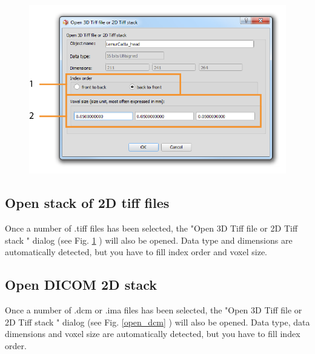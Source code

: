\begin{figure}
  \centering  
 \includegraphics[scale=1]{images/07/volume/open_tiff2.png}
\label{open_tiff}
\end{figure}


\subsection{Open stack of 2D tiff files}

Once a number of .tiff files has been selected, the "Open 3D Tiff file or 2D Tiff stack " dialog (see Fig. \ref{open_tiff} \pageref{open_tiff}) will also be opened. Data type and dimensions are automatically detected, but you have to fill index order and voxel size.


\subsection{Open DICOM 2D stack}
Once a number of .dcm or .ima files has been selected, the "Open 3D Tiff file or 2D Tiff stack " dialog (see Fig. \ref{open_dcm} \pageref{open_dcm}) will also be opened. Data type, data dimensions and voxel size are automatically detected, but you have to fill index order.

